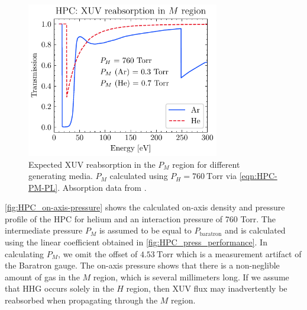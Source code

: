 \begin{figure}
	\centering
	\includegraphics[width=0.75\textwidth]{figures/chap3/HPC_absorption.pdf}
	\caption{Expected XUV reabsorption in the $P_M$ region for different generating media. $P_M$ calculated using $P_H = 760 \ \textrm{Torr}$ via \cref{eqn:HPC-PM-PL}. Absorption data from \cite{gulliksonCXROXRayInteractions}.}
	\label{fig:HPC_absorption}
\end{figure}

\cref{fig:HPC_on-axis-pressure} shows the calculated on-axis density and pressure profile of the HPC for helium and an interaction pressure of 760 Torr. The intermediate pressure $P_M$ is assumed to be equal to $P_{\textrm{baratron}}$ and is calculated using the linear coefficient obtained in \cref{fig:HPC_press_performance}. In calculating $P_M$, we omit the offset of $4.53 \ \textrm{Torr}$ which is a measurement artifact of the Baratron gauge. The on-axis pressure shows that there is a non-neglible amount of gas in the $M$ region, which is several millimeters long. If we assume that HHG occurs solely in the $H$ region, then XUV flux may inadvertently be reabsorbed when propagating through the $M$ region.


